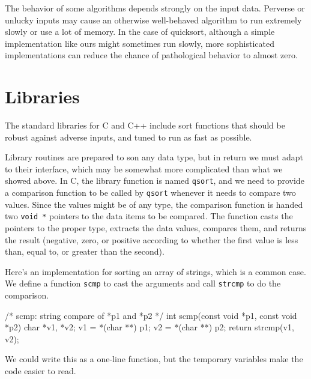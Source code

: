 The behavior of some algorithms depends strongly on the input data.
Perverse or unlucky inputs may cause an otherwise well-behaved algorithm to
run extremely slowly or use a lot of memory. In the case of quicksort,
although a simple implementation like ours might sometimes run slowly, more
sophisticated implementations can reduce the chance of pathological
behavior to almost zero.


\section{Libraries}
\label{sec:libraries}
The standard libraries for C and C++ include sort functions that should be
robust against adverse inputs, and tuned to run as fast as possible.

Library routines are prepared to son any data type, but in return we must
adapt to their interface, which may be somewhat more complicated than what
we showed above. In C, the library function is named \verb'qsort', and we
need to provide a comparison function to be called by \verb'qsort' whenever
it needs to compare two values. Since the values might be of any type, the
comparison function is handed two \texttt{void *} pointers to the data items
to be compared. The function casts the pointers to the proper type,
extracts the data values, compares them, and returns the result (negative,
zero, or positive according to whether the first value is less than, equal
to, or greater than the second).

Here's an implementation for sorting an array of strings, which is a common
case. We define a function \verb'scmp' to cast the arguments and call
\verb'strcmp' to do the comparison.

\begin{wellcode}
    /* scmp: string compare of *p1 and *p2 */
    int scmp(const void *p1, const void *p2)
    {
        char *v1, *v2;
        v1 = *(char **) p1;
        v2 = *(char **) p2;
        return strcmp(v1, v2);
    }
\end{wellcode}
We could write this as a one-line function, but the temporary variables
make the code easier to read.

